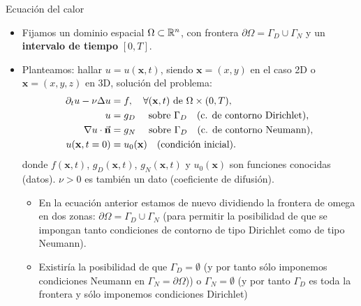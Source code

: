 \documentclass[9pt, dvipsnames,]{beamer}
\begin{document}
\begin{frame}{Ecuación del calor}
  \begin{itemize}

  \item
  Fijamos un dominio espacial $\Omega\subset{\mathbb R}^n$,
  con frontera $\partial\Omega=\Gamma_D\cup\Gamma_N$ y un \textbf{intervalo de
    tiempo} $[0,T]$.


\item
  Planteamos: hallar $u=u(\mathbf{x}, t)$, siendo $\mathbf{x}=(x,y)$ en el caso 2D
  o $\mathbf{x}=(x,y,z)$ en 3D, solución del problema:
   \begin{align*}
   \partial_t u - \nu\Delta u &= f, \quad \forall(\mathbf{x},t)\text{ de }\Omega\times (0,T), \\
   u &= g_D \quad\text{ sobre } \Gamma_D \quad \text{(c. de contorno Dirichlet)},\\
   \nabla u\cdot\vec{\mathbf{n}} &= g_N \quad\text{ sobre } \Gamma_D \quad \text{(c. de contorno Neumann)},\\
   u(\mathbf{x},t=0) &= u_0(\mathbf{x}) \quad \text{(condición inicial)}.
 \end{align*}
 donde $f(\mathbf{x},t)$, $g_D(\mathbf{x},t)$, $g_N(\mathbf{x},t)$ y
 $u_0(\mathbf{x})$ son funciones conocidas (datos). $\nu>0$ es también un dato (coeficiente de difusión).

 \vfill
 \begin{small}
 \begin{itemize}
 \item
   En la ecuación anterior estamos de nuevo dividiendo la frontera de
   omega en dos zonas: $\partial\Omega=\Gamma_D\cup\Gamma_N$ (para
   permitir la posibilidad de que se impongan tanto condiciones de
   contorno de tipo Dirichlet como de tipo Neumann).
 \item Existiría la posibilidad de que $\Gamma_D=\emptyset$ (y por
   tanto sólo imponemos condiciones Neumann en
   $\Gamma_N=\partial\Omega$)) o $\Gamma_N=\emptyset$ (y por tanto
   $\Gamma_D$ es toda la frontera y sólo imponemos condiciones
   Dirichlet)
 \end{itemize}
\end{small}
\end{itemize}
\end{frame}
\end{document}
